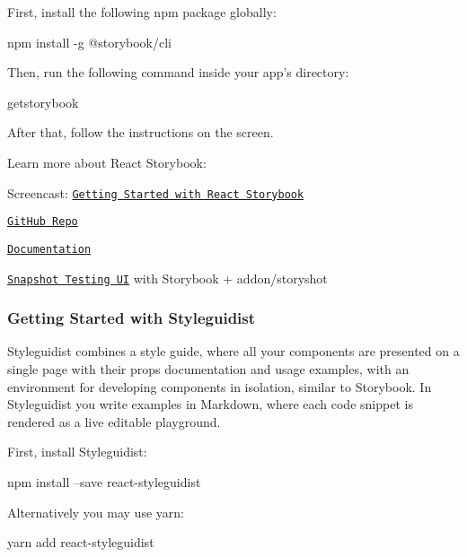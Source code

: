 First, install the following npm package globally\+:


\begin{DoxyCode}
npm install -g @storybook/cli
\end{DoxyCode}


Then, run the following command inside your app’s directory\+:


\begin{DoxyCode}
getstorybook
\end{DoxyCode}


After that, follow the instructions on the screen.

Learn more about React Storybook\+:


\begin{DoxyItemize}
\item Screencast\+: \href{https://egghead.io/lessons/react-getting-started-with-react-storybook}{\tt Getting Started with React Storybook}
\item \href{https://github.com/storybooks/storybook}{\tt Git\+Hub Repo}
\item \href{https://storybook.js.org/basics/introduction/}{\tt Documentation}
\item \href{https://github.com/storybooks/storybook/tree/master/addons/storyshots}{\tt Snapshot Testing UI} with Storybook + addon/storyshot
\end{DoxyItemize}

\subsubsection*{Getting Started with Styleguidist}

Styleguidist combines a style guide, where all your components are presented on a single page with their props documentation and usage examples, with an environment for developing components in isolation, similar to Storybook. In Styleguidist you write examples in Markdown, where each code snippet is rendered as a live editable playground.

First, install Styleguidist\+:


\begin{DoxyCode}
npm install --save react-styleguidist
\end{DoxyCode}


Alternatively you may use {\ttfamily yarn}\+:


\begin{DoxyCode}
yarn add react-styleguidist
\end{DoxyCode}


